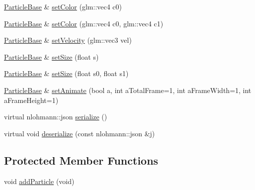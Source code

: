 \begin{DoxyCompactItemize}
\item 
\mbox{\hyperlink{class_beer_engine_1_1_component_1_1_particle_base}{Particle\+Base}} \& \mbox{\hyperlink{class_beer_engine_1_1_component_1_1_particle_base_a9217363eb47c65426dfbee8c03376043}{set\+Color}} (glm\+::vec4 c0)
\item 
\mbox{\hyperlink{class_beer_engine_1_1_component_1_1_particle_base}{Particle\+Base}} \& \mbox{\hyperlink{class_beer_engine_1_1_component_1_1_particle_base_a1d89c8ce8200884d73281f1b4a27ba9a}{set\+Color}} (glm\+::vec4 c0, glm\+::vec4 c1)
\item 
\mbox{\hyperlink{class_beer_engine_1_1_component_1_1_particle_base}{Particle\+Base}} \& \mbox{\hyperlink{class_beer_engine_1_1_component_1_1_particle_base_acb44169a66aca05b0095b6ae9992ff8e}{set\+Velocity}} (glm\+::vec3 vel)
\item 
\mbox{\hyperlink{class_beer_engine_1_1_component_1_1_particle_base}{Particle\+Base}} \& \mbox{\hyperlink{class_beer_engine_1_1_component_1_1_particle_base_a69899aa53162738931a1e3ef5b56fc79}{set\+Size}} (float s)
\item 
\mbox{\hyperlink{class_beer_engine_1_1_component_1_1_particle_base}{Particle\+Base}} \& \mbox{\hyperlink{class_beer_engine_1_1_component_1_1_particle_base_a8474f6429168a3695162b54259855e3c}{set\+Size}} (float s0, float s1)
\item 
\mbox{\hyperlink{class_beer_engine_1_1_component_1_1_particle_base}{Particle\+Base}} \& \mbox{\hyperlink{class_beer_engine_1_1_component_1_1_particle_base_adfa9cb8fefe1f3ffee2f67ac4bf2f7d3}{set\+Animate}} (bool a, int a\+Total\+Frame=1, int a\+Frame\+Width=1, int a\+Frame\+Height=1)
\item 
virtual nlohmann\+::json \mbox{\hyperlink{class_beer_engine_1_1_component_1_1_particle_base_ac4ab484a5ef468cbb69cccdf39e6d9a8}{serialize}} ()
\item 
virtual void \mbox{\hyperlink{class_beer_engine_1_1_component_1_1_particle_base_a227b7fe0edab6df4b6c15f4b22bed7ae}{deserialize}} (const nlohmann\+::json \&j)
\end{DoxyCompactItemize}
\subsection*{Protected Member Functions}
\begin{DoxyCompactItemize}
\item 
void \mbox{\hyperlink{class_beer_engine_1_1_component_1_1_particle_base_a6191ae1cb301a45bbf7414fedc5e1b05}{add\+Particle}} (void)
\end{DoxyCompactItemize}
